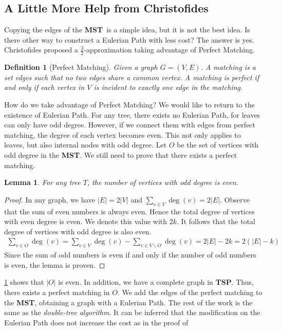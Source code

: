 \documentclass[11pt,psfig,times]{article}
\newcommand*{\mst}{\textbf{MST}}
\newcommand*{\tsp}{\textbf{TSP}}
\newtheorem{lemma}[theorem]{Lemma}
\newtheorem{definition}[theorem]{Definition}
\begin{document}
\subsection{A Little More Help from Christofides}
Copying the edges of the \mst\ is a simple idea, but it is not the best idea. Is there other way to 
construct a Eulerian Path with less cost? The answer is yes. Christofides proposed a $\frac{3}{2}$-approximation 
taking advantage of Perfect Matching.
\begin{definition}[Perfect Matching]
    Given a graph $G = (V, E)$. A matching is a set edges such that no two edges share a common vertex.
    A matching is perfect if and only if each vertex in $V$ is incident to exactly one edge in the matching.
\end{definition}
How do we take advantage of Perfect Matching? We would like to return to the existence of Eulerian Path. 
For any tree, there exists no Eulerian Path, for leaves can only have odd degree. However, if we connect 
them with edges from perfect matching, the degree of each vertex becomes even. This not only applies to 
leaves, but also internal nodes with odd degree. Let $O$ be the set of vertices with odd degree in the \mst.
We still need to prove that there exists a perfect matching. 
\begin{lemma}
    \label{lemma:odd}
    For any tree $T$, the number of vertices with odd degree is even.
\end{lemma}
\begin{proof}
    In any graph, we have $|E| = 2|V|$ and $\sum_{v \in V} \deg(v) = 2|E|$. Observe that the sum of even numbers 
    is always even. Hence the total degree of vertices with even degree is even. We denote this value with $2k$.
    It follows that the total degree of vertices with odd degree is also even.
    \begin{align*}
        \sum_{v \in O} \deg(v) = \sum_{v \in V} \deg(v) - \sum_{v \in V \backslash O} \deg(v) = 2|E| - 2k = 2(|E| - k)
    \end{align*}
    Since the sum of odd numbers is even if and only if the number of odd numbers is even, the lemma is proven.
\end{proof}
\cref{lemma:odd} shows that $|O|$ is even. In addition, we have a complete graph in \tsp. Thus, there exists 
a perfect matching in $O$. We add the edges of the perfect matching to the \mst, obtaining a graph with a 
Eulerian Path. The rest of the work is the same as the \textit{double-tree algorithm}. 
It can be inferred that the modification on the Eulerian Path does not increase the cost as in the proof of 
\end{document}

